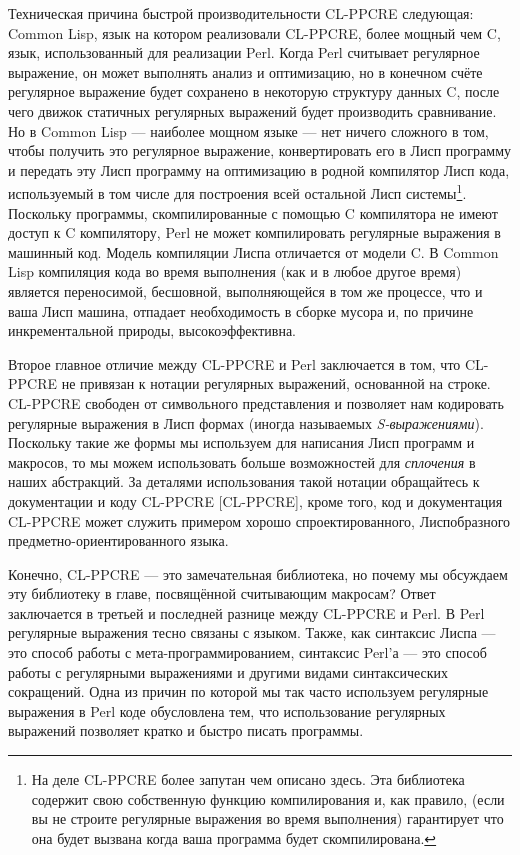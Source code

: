 Техническая причина быстрой производительности CL-PPCRE следующая: Common Lisp, язык на котором реализовали CL-PPCRE, более мощный чем C, язык, использованный для реализации Perl. Когда Perl считывает регулярное выражение, он может выполнять анализ и оптимизацию, но в конечном счёте регулярное выражение будет сохранено в некоторую структуру данных C, после чего движок статичных регулярных выражений будет производить сравнивание. Но в Common Lisp --- наиболее мощном языке --- нет ничего сложного в том, чтобы получить это регулярное выражение, конвертировать его в Лисп программу и передать эту Лисп программу на оптимизацию в родной компилятор Лисп кода, используемый в том числе для построения всей остальной Лисп системы\footnote{На деле CL-PPCRE более запутан чем описано здесь. Эта библиотека содержит свою собственную функцию компилирования и, как правило, (если вы не строите регулярные выражения во время выполнения) гарантирует что она будет вызвана когда ваша программа будет скомпилирована.}. Поскольку программы, скомпилированные с помощью C компилятора не имеют доступ к C компилятору, Perl не может компилировать регулярные выражения в машинный код. Модель компиляции Лиспа отличается от модели C. В Common Lisp компиляция кода во время выполнения (как и в любое другое время) является переносимой, бесшовной, выполняющейся в том же процессе, что и ваша Лисп машина, отпадает необходимость в сборке мусора и, по причине инкрементальной природы, высокоэффективна.

Второе главное отличие между CL-PPCRE и Perl заключается в том, что CL-PPCRE не привязан к нотации регулярных выражений, основанной на строке. CL-PPCRE свободен от символьного представления и позволяет нам кодировать регулярные выражения в Лисп формах (иногда называемых \emph{S-выражениями}). Поскольку такие же формы мы используем для написания Лисп программ и макросов, то мы можем использовать больше возможностей для \emph{сплочения} в наших абстракций. За деталями использования такой нотации обращайтесь к документации и коду CL-PPCRE [CL-PPCRE], кроме того, код и документация CL-PPCRE может служить примером хорошо спроектированного, Лиспобразного предметно-ориентированного языка.

Конечно, CL-PPCRE --- это замечательная библиотека, но почему мы обсуждаем эту библиотеку в главе, посвящённой считывающим макросам? Ответ заключается в третьей и последней разнице между CL-PPCRE и Perl. В Perl регулярные выражения тесно связаны с языком. Также, как синтаксис Лиспа --- это способ работы с ме\-та-про\-грам\-ми\-ро\-ва\-нием, синтаксис Perl'а --- это способ работы с регулярными выражениями и другими видами синтаксических сокращений. Одна из причин по которой мы так часто используем регулярные выражения в Perl коде обусловлена тем, что использование регулярных выражений позволяет кратко и быстро писать программы.

